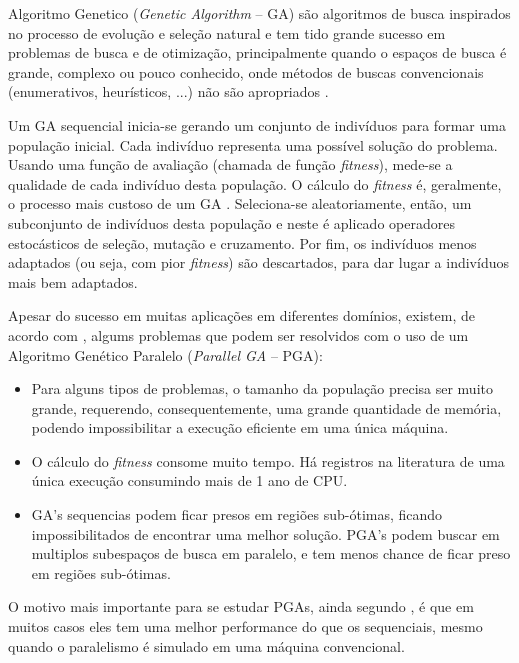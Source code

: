 \documentclass[12pt]{article}
\begin{document}

Algoritmo Genetico (\emph{Genetic Algorithm} -- GA) são algoritmos de busca inspirados no processo de evolução e seleção natural \cite{goldberg1989} e tem tido grande sucesso em problemas de busca e de otimização, principalmente quando o espaços de busca é grande, complexo ou pouco conhecido, onde métodos de buscas convencionais (enumerativos, heurísticos, ...) não são apropriados \cite{herrera1998}. 

Um GA sequencial inicia-se gerando um conjunto de indivíduos para formar uma população inicial. Cada indivíduo representa uma possível solução do problema. Usando uma função de avaliação (chamada de função \emph{fitness}), mede-se a qualidade de cada indivíduo desta população. O cálculo do \emph{fitness} é, geralmente, o processo mais custoso de um GA \cite{paraleltax}. Seleciona-se aleatoriamente, então, um subconjunto de indivíduos desta população e neste é aplicado operadores estocásticos de seleção, mutação e cruzamento. Por fim, os indivíduos menos adaptados (ou seja, com pior \emph{fitness}) são descartados, para dar lugar a indivíduos mais bem adaptados.

Apesar do sucesso em muitas aplicações em diferentes domínios, existem, de acordo com \cite{paraleltax}, algums problemas que podem ser resolvidos com o uso de um Algoritmo Genético Paralelo (\emph{Parallel GA} -- PGA):

\begin{itemize}
  \item Para alguns tipos de problemas, o tamanho da população precisa ser muito grande, requerendo, consequentemente, uma grande quantidade de memória, podendo impossibilitar a execução eficiente em uma única máquina.
  \item O cálculo do \emph{fitness} consome muito tempo. Há registros na literatura de uma única execução consumindo mais de 1 ano de CPU.
  \item GA's sequencias podem ficar presos em regiões sub-ótimas, ficando impossibilitados de encontrar uma melhor solução. PGA's podem buscar em multiplos subespaços de busca em paralelo, e tem menos chance de ficar preso em regiões sub-ótimas.
\end{itemize}

O motivo mais importante para se estudar PGAs, ainda segundo \cite{paraleltax}, é que em muitos casos eles tem uma melhor performance do que os sequenciais, mesmo quando o paralelismo é simulado em uma máquina convencional. 
\end{document}
